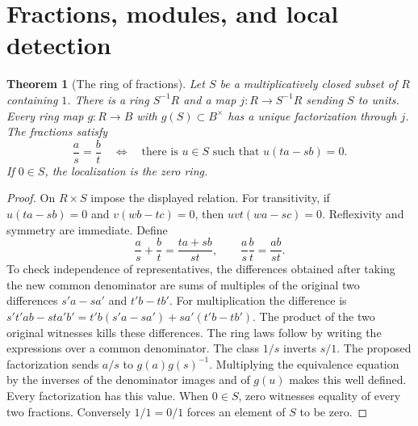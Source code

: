 \documentclass[11pt,oneside,openany]{book}
\newtheorem{theorem}{Theorem}[chapter]
\theoremstyle{definition}
\theoremstyle{remark}
\begin{document}
\section{Fractions, modules, and local detection}

\begin{theorem}[The ring of fractions]\label{p103:ALG-05-C01-R01}
Let \(S\) be a multiplicatively closed subset of \(R\) containing \(1\). There is a ring \(S^{-1}R\) and a map \(j:R\to S^{-1}R\) sending \(S\) to units. Every ring map \(g:R\to B\) with \(g(S)\subset B^\times\) has a unique factorization through \(j\). The fractions satisfy
\[
 \frac{a}{s}=\frac{b}{t}\quad\Longleftrightarrow\quad
 \text{there is \(u\in S\) such that \(u(ta-sb)=0\)}.
\]
If \(0\in S\), the localization is the zero ring.
\end{theorem}
\begin{proof}
On \(R\times S\) impose the displayed relation. For transitivity, if \(u(ta-sb)=0\) and \(v(wb-tc)=0\), then \(uvt(wa-sc)=0\). Reflexivity and symmetry are immediate. Define
\[
 \frac{a}{s}+\frac{b}{t}=\frac{ta+sb}{st},
 \qquad
 \frac{a}{s}\frac{b}{t}=\frac{ab}{st}.
\]
To check independence of representatives, the differences obtained after taking the new common denominator are sums of multiples of the original two differences \(s'a-sa'\) and \(t'b-tb'\). For multiplication the difference is
\(s't'ab-sta'b'=t'b(s'a-sa')+sa'(t'b-tb')\).
The product of the two original witnesses kills these differences. The ring laws follow by writing the expressions over a common denominator. The class \(1/s\) inverts \(s/1\). The proposed factorization sends \(a/s\) to \(g(a)g(s)^{-1}\). Multiplying the equivalence equation by the inverses of the denominator images and of \(g(u)\) makes this well defined. Every factorization has this value. When \(0\in S\), zero witnesses equality of every two fractions. Conversely \(1/1=0/1\) forces an element of \(S\) to be zero.
\end{proof}
\end{document}
